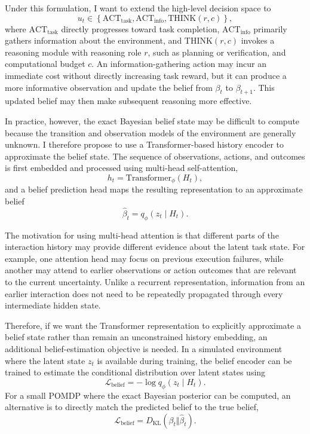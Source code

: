 \documentclass[11pt]{article}
\begin{document}
Under this formulation, I want to extend the high-level decision space to
\[
u_t\in
\left\{
\mathrm{ACT}_{\mathrm{task}},
\mathrm{ACT}_{\mathrm{info}},
\mathrm{THINK}(r,c)
\right\},
\]
where $\mathrm{ACT}_{\mathrm{task}}$ directly progresses toward task completion, $\mathrm{ACT}_{\mathrm{info}}$ primarily gathers information about the environment, and $\mathrm{THINK}(r,c)$ invokes a reasoning module with reasoning role $r$, such as planning or verification,  and computational budget $c$. An information-gathering action may incur an immediate cost without directly increasing task reward, but it can produce a more informative observation and update the belief from $\beta_t$ to $\beta_{t+1}$. This updated belief may then make subsequent reasoning more effective.

In practice, however, the exact Bayesian belief state may be difficult to compute because the transition and observation models of the environment are generally unknown. I therefore propose to use a Transformer-based history encoder to approximate the belief state. The sequence of observations, actions, and outcomes is first embedded and processed using multi-head self-attention,
\[
h_t =
\mathrm{Transformer}_{\phi}(H_t),
\]
and a belief prediction head maps the resulting representation to an approximate belief
\[
\hat{\beta}_t
=
q_{\phi}(z_t\mid H_t).
\]

The motivation for using multi-head attention is that different parts of the interaction history may provide different evidence about the latent task state. For example, one attention head may focus on previous execution failures, while another may attend to earlier observations or action outcomes that are relevant to the current uncertainty. Unlike a recurrent representation, information from an earlier interaction does not need to be repeatedly propagated through every intermediate hidden state.

Therefore, if we want the Transformer representation to explicitly approximate a belief state rather than remain an unconstrained history embedding, an additional belief-estimation objective is needed. In a simulated environment where the latent state $z_t$ is available during training, the belief encoder can be trained to estimate the conditional distribution over latent states using
\[
\mathcal{L}_{\mathrm{belief}}
=
-\log q_{\phi}(z_t\mid H_t).
\]
For a small POMDP where the exact Bayesian posterior can be computed, an alternative is to directly match the predicted belief to the true belief,
\[
\mathcal{L}_{\mathrm{belief}}
=
D_{\mathrm{KL}}
\left(
\beta_t
\Vert
\hat{\beta}_t
\right).
\]
\end{document}
